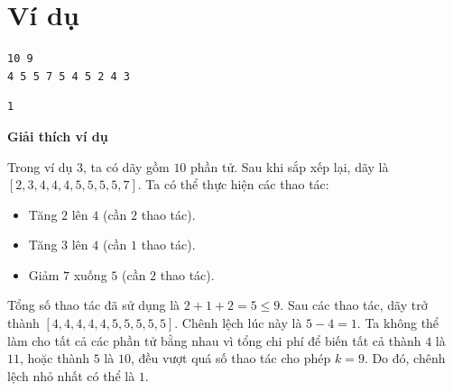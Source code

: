 \documentclass[12pt,a4paper]{article}
\newcommand{\explanation}{%
  \vspace{6pt}\textbf{\textcolor{sectioncolor}{Giải thích ví dụ}}\par\vspace{2pt}%
}
\begin{document}
\section*{Ví dụ}
\begin{inputbox}
\begin{lstlisting}
10 9
4 5 5 7 5 4 5 2 4 3
\end{lstlisting}
\end{inputbox}
\begin{outputbox}
\begin{lstlisting}
1
\end{lstlisting}
\end{outputbox}
\explanation
Trong ví dụ 3, ta có dãy gồm $10$ phần tử. Sau khi sắp xếp lại, dãy là $[2, 3, 4, 4, 4, 5, 5, 5, 5, 7]$.
Ta có thể thực hiện các thao tác:
\begin{itemize}[leftmargin=1.5em, nosep]
    \item Tăng $2$ lên $4$ (cần $2$ thao tác).
    \item Tăng $3$ lên $4$ (cần $1$ thao tác).
    \item Giảm $7$ xuống $5$ (cần $2$ thao tác).
\end{itemize}
Tổng số thao tác đã sử dụng là $2 + 1 + 2 = 5 \le 9$.
Sau các thao tác, dãy trở thành $[4, 4, 4, 4, 4, 5, 5, 5, 5, 5]$. Chênh lệch lúc này là $5 - 4 = 1$.
Ta không thể làm cho tất cả các phần tử bằng nhau vì tổng chi phí để biến tất cả thành $4$ là $11$, hoặc thành $5$ là $10$, đều vượt quá số thao tác cho phép $k = 9$. Do đó, chênh lệch nhỏ nhất có thể là $1$.


\newpage
\end{document}
